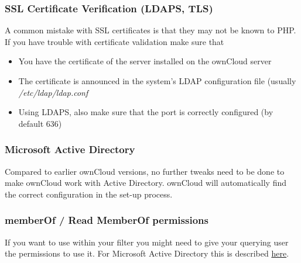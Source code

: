 \documentclass[letterpaper,10pt,english]{sphinxmanual}
\begin{document}
\subsubsection{SSL Certificate Verification (LDAPS, TLS)}
\label{configuration_user/user_auth_ldap:ssl-certificate-verification-ldaps-tls}
A common mistake with SSL certificates is that they may not be known to PHP.
If you have trouble with certificate validation make sure that
\begin{itemize}
\item {} 
You have the certificate of the server installed on the ownCloud server

\item {} 
The certificate is announced in the system's LDAP configuration file (usually
\emph{/etc/ldap/ldap.conf}

\end{itemize}
\begin{itemize}
\item {} 
Using LDAPS, also make sure that the port is correctly configured (by default
636)

\end{itemize}


\subsubsection{Microsoft Active Directory}
\label{configuration_user/user_auth_ldap:microsoft-active-directory}
Compared to earlier ownCloud versions, no further tweaks need to be done to
make ownCloud work with Active Directory. ownCloud will automatically find the
correct configuration in the set-up process.


\subsubsection{memberOf / Read MemberOf permissions}
\label{configuration_user/user_auth_ldap:memberof-read-memberof-permissions}
If you want to use  within your filter you might need to give your
querying user the permissions to use it. For Microsoft Active Directory this
is described \href{https://serverfault.com/questions/167371/what-permissions-are-required-for-enumerating-users-groups-in-active-directory/167401\#167401}{here}.
\end{document}
